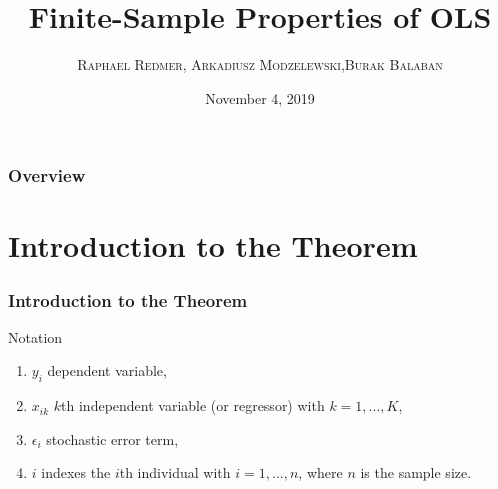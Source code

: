 \documentclass{beamer}
\title[Finite-Sample Properties of OLS]{Finite-Sample Properties of OLS}
\author[\textsc{Redmer, Modzelewski, Balaban}]{ \textsc{Raphael Redmer}, \textsc{Arkadiusz Modzelewski},\newline \textsc{Burak Balaban}}
\institute[TIPE]{University of Bonn \\ Research Module in Econometrics and Statistics}
\date{November 4, 2019}
\begin{document}
\begin{frame}
\titlepage %
\end{frame}

\begin{frame}
\frametitle{Overview} %
\tableofcontents
\end{frame}



\section{Introduction to the Theorem}

\begin{frame}
\frametitle{Introduction to the Theorem}
\begin{block}{Notation}
\begin{enumerate}

    \item    $y_{i}$ dependent variable,
    \item $ x_{ik}$ $ k$th independent variable (or regressor) with $k = 1,...,K$,
    \item $\epsilon_{i}$  stochastic error term,
    \item $i$ indexes the $i$th individual with $i = 1,...,n$, where $n$ is the sample size.
    
\end{enumerate}
\end{block}
\end{frame}

\end{document}
